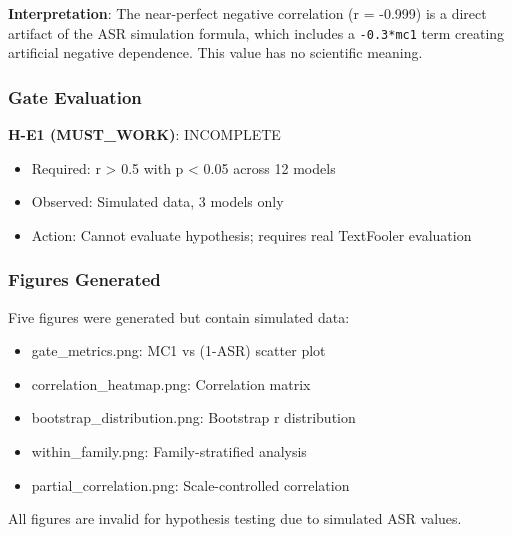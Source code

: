 \begin{table}[htbp]
\centering
{}
\end{table}

\textbf{Interpretation}: The near-perfect negative correlation (r = -0.999) is a direct artifact of the ASR simulation formula, which includes a \texttt{-0.3*mc1} term creating artificial negative dependence. This value has no scientific meaning.

\subsubsection{Gate Evaluation}

\textbf{H-E1 (MUST\_WORK)}: INCOMPLETE

\begin{itemize}
\item Required: r > 0.5 with p < 0.05 across 12 models
\item Observed: Simulated data, 3 models only
\item Action: Cannot evaluate hypothesis; requires real TextFooler evaluation
\end{itemize}

\subsubsection{Figures Generated}

Five figures were generated but contain simulated data:
\begin{itemize}
\item gate\_metrics.png: MC1 vs (1-ASR) scatter plot
\item correlation\_heatmap.png: Correlation matrix
\item bootstrap\_distribution.png: Bootstrap r distribution
\item within\_family.png: Family-stratified analysis
\item partial\_correlation.png: Scale-controlled correlation
\end{itemize}

All figures are invalid for hypothesis testing due to simulated ASR values.

